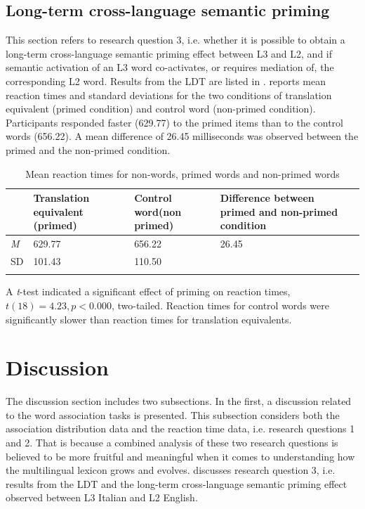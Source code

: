 \documentclass[output=paper,colorlinks,citecolor=brown,nonflat]{langsci/langscibook}
\begin{document}
\subsection{Long-term cross-language semantic priming}\label{sec:gudmundson:3.3}

This section refers to research question 3, i.e. whether it is possible to obtain a long-term cross-language semantic priming effect between L3 and L2, and if semantic activation of an L3 word co-activates, or requires mediation of, the corresponding L2 word. Results from the LDT are listed in .  reports mean reaction times and standard deviations for the two conditions of translation equivalent (primed condition) and control word (non-primed condition). Participants responded faster (629.77) to the primed items than to the control words (656.22). A mean difference of 26.45 milliseconds was observed between the primed and the non-primed condition.

\begin{table}
\small
    \begin{tabularx}{\textwidth}{lR{3.5cm}R{2.5cm}R{4.5cm}c}
    \lsptoprule
        ~ & Translation equivalent (primed) & Control word\newline\noindent(non primed) & Difference between primed and non-primed condition\\
    \midrule
        \textit{M} & 629.77 & 656.22 & 26.45\\
        SD & 101.43 & 110.50 & \\
    \lspbottomrule
    \end{tabularx}
    \caption{Mean reaction times for non-words, primed words and non-primed words}
    \label{tab:gudmundson:6}
\end{table}

A \textit{t}-test indicated a significant effect of priming on reaction times, $t(18) = 4.23, p < 0.000$, two-tailed. Reaction times for control words were significantly slower than reaction times for translation equivalents.

\section{Discussion}\label{sec:gudmundson:4}

The discussion section includes two subsections. In the first, a discussion related to the word association tasks is presented. This subsection considers both the association distribution data and the reaction time data, i.e. research questions 1 and 2. That is because a combined analysis of these two research questions is believed to be more fruitful and meaningful when it comes to understanding how the multilingual lexicon grows and evolves.  discusses research question 3, i.e. results from the LDT and the long-term cross-language semantic priming effect observed between L3 Italian and L2 English.
\end{document}
